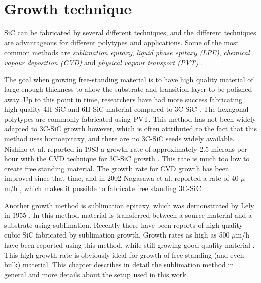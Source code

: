 \chapter{Growth technique}
\label{sec:growth}

	

SiC can be fabricated by several different techniques, and the different techniques are advantageous for different polytypes and applications. Some of the most common methods are \emph{sublimation epitaxy}, \emph{liquid phase epitaxy (LPE)}, \emph{chemical vapour deposition (CVD)} and \emph{physical vapour transport (PVT)} \cite{Ivanov1999}. 

The goal when growing free-standing material is to have high quality material of large enough thickness to allow the substrate and transition layer to be polished away. Up to this point in time, researchers have had more success fabricating high quality 4H-SiC and 6H-SiC material compared to 3C-SiC \cite{J.B.CASADYandR.W.JOHNSON1996}. The hexagonal polytypes are commonly fabricated using PVT. This method has not been widely adapted to 3C-SiC growth however, which is often attributed to the fact that this method uses homoepitaxy, and there are no 3C-SiC seeds widely available. Nishino et al. reported in 1983 a growth rate of approximately 2.5 microns per hour with the CVD technique for 3C-SiC growth \cite{Nishino1983}. This rate is much too low to create free standing material. The growth rate for CVD growth has been improved since that time, and in 2002 Nagasawa et al. reported a rate of 40 $\mu$m/h \cite{Nagasawa2002}, which makes it possible to fabricate free standing 3C-SiC. 

Another growth method is sublimation epitaxy, which was demonstrated by Lely in 1955 \cite{Lely1955}. In this method material is transferred between a source material and a substrate using sublimation. Recently there have been reports of high quality cubic SiC fabricated by sublimation growth. Growth rates as high as 500 $\mu$m/h have been reported using this method, while still growing good quality material \cite{Jokubavicius2014}. This high growth rate is obviously ideal for growth of free-standing (and even bulk) material. This chapter describes in detail the sublimation method in general and more details about the setup used in this work. 
 
